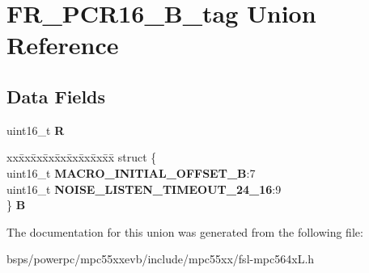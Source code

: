 \hypertarget{unionFR__PCR16__16B__tag}{}\section{F\+R\+\_\+\+P\+C\+R16\+\_\+B\+\_\+tag Union Reference}
\label{unionFR__PCR16__16B__tag}
\subsection*{Data Fields}
\begin{DoxyCompactItemize}
\item 
\mbox{\label{unionFR__PCR16__16B__tag_aefa79a3dd9914dd90d9259175a2eba9c}} 
uint16\+\_\+t {\bfseries R}
\item 
\mbox{\label{unionFR__PCR16__16B__tag_a6f6285a39068b8b04919d439c58baf1a}} 
\begin{tabbing}
xx\=xx\=xx\=xx\=xx\=xx\=xx\=xx\=xx\=\kill
struct \{\\
\>uint16\_t {\bfseries MACRO\_INITIAL\_OFFSET\_B}:7\\
\>uint16\_t {\bfseries NOISE\_LISTEN\_TIMEOUT\_24\_16}:9\\
\} {\bfseries B}\\

\end{tabbing}\end{DoxyCompactItemize}


The documentation for this union was generated from the following file\+:\begin{DoxyCompactItemize}
\item 
bsps/powerpc/mpc55xxevb/include/mpc55xx/fsl-\/mpc564x\+L.\+h\end{DoxyCompactItemize}
